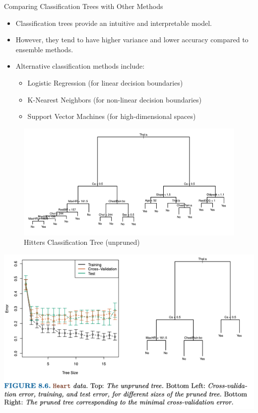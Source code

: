 \documentclass[aspectratio=169,xcolor=dvipsnames]{beamer}
\begin{document}
\begin{frame}{Comparing Classification Trees with Other Methods}
    \begin{itemize}
    \setlength\itemsep{0.5cm}
        \item Classification trees provide an intuitive and interpretable model.
        \item However, they tend to have higher variance and lower accuracy compared to ensemble methods.
        \item Alternative classification methods include:
        \begin{itemize}
            \item Logistic Regression (for linear decision boundaries)
            \item K-Nearest Neighbors (for non-linear decision boundaries)
            \item Support Vector Machines (for high-dimensional spaces)
        \end{itemize}
    \end{itemize}
\end{frame}

\begin{frame}
\begin{figure}
\centering
\includegraphics[scale = 0.65]{images/pruned_class.png}
\caption{Hitters Classification Tree (unpruned)}
\end{figure}
\end{frame}

\begin{frame}
\centering
\includegraphics[scale = 0.6]{images/big_class.png}
\end{frame}
\end{document}
